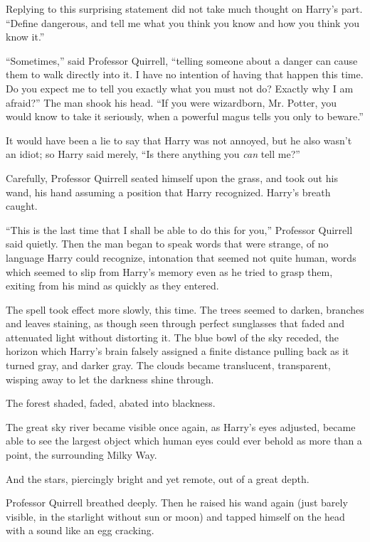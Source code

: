 Replying to this surprising statement did not take much thought on Harry's part. ``Define dangerous, and tell me what you think you know and how you think you know it.''

``Sometimes,'' said Professor Quirrell, ``telling someone about a danger can cause them to walk directly into it. I have no intention of having that happen this time. Do you expect me to tell you exactly what you must not do? Exactly why I am afraid?'' The man shook his head. ``If you were wizardborn, Mr. Potter, you would know to take it seriously, when a powerful magus tells you only to beware.''

It would have been a lie to say that Harry was not annoyed, but he also wasn't an idiot; so Harry said merely, ``Is there anything you \emph{can} tell me?''

Carefully, Professor Quirrell seated himself upon the grass, and took out his wand, his hand assuming a position that Harry recognized. Harry's breath caught.

``This is the last time that I shall be able to do this for you,'' Professor Quirrell said quietly. Then the man began to speak words that were strange, of no language Harry could recognize, intonation that seemed not quite human, words which seemed to slip from Harry's memory even as he tried to grasp them, exiting from his mind as quickly as they entered.

The spell took effect more slowly, this time. The trees seemed to darken, branches and leaves staining, as though seen through perfect sunglasses that faded and attenuated light without distorting it. The blue bowl of the sky receded, the horizon which Harry's brain falsely assigned a finite distance pulling back as it turned gray, and darker gray. The clouds became translucent, transparent, wisping away to let the darkness shine through.

The forest shaded, faded, abated into blackness.

The great sky river became visible once again, as Harry's eyes adjusted, became able to see the largest object which human eyes could ever behold as more than a point, the surrounding Milky Way.

And the stars, piercingly bright and yet remote, out of a great depth.

Professor Quirrell breathed deeply. Then he raised his wand again (just barely visible, in the starlight without sun or moon) and tapped himself on the head with a sound like an egg cracking.


